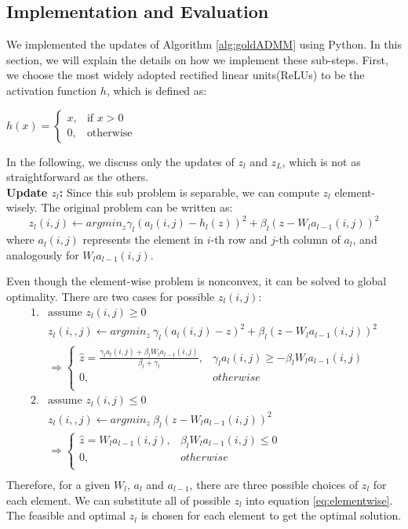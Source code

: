 \documentclass[letterpaper, 10 pt, conference]{ieeeconf}  %
\begin{document}
\subsection{Implementation and Evaluation}
We implemented the updates of  Algorithm \ref{alg:goldADMM} using Python. In this section, we will explain the details on how we implement these sub-steps. First, we choose the most widely adopted rectified linear units(ReLUs) to be the activation function $h$, which is defined as:
\begin{center}
$h(x) = \begin{cases} x, & \mbox{if } x> 0 \\0, & \mbox{otherwise }\end{cases} $
\end{center}

In the following, we discuss only the updates of $z_l$ and $z_L$, which is not as straightforward as the others.\\
\textbf{Update $z_l$:  } Since this sub problem is separable, we can compute $z_l$ element-wisely. The original problem can be written as:
\begin{equation}
z_l(i,j) \gets argmin_z \gamma_l(a_l(i,j)-h_l(z))^2 + \beta_l(z-W_la_{l-1}(i,j))^2
\label{eq:elementwise}
\end{equation}
where $a_l(i,j)$ represents the element in $i$-th row and $j$-th column of $a_l$, and analogously for $W_la_{l-1}(i,j)$.

Even though the element-wise problem is nonconvex, it can be solved to global optimality. There are two cases for possible $z_l(i,j)$:
\begin{equation}
\begin{aligned}
1. & \text{assume } z_l(i,j) \geq 0 \\
& z_l(i,,j) \gets argmin_z ~\gamma_l(a_l(i,j)-z)^2 + \beta_l(z-W_la_{l-1}(i,j))^2\\
& \Rightarrow \left\{
\begin{array}{ll}
      \widehat{z} = \frac{\gamma_la_l(i,j)+\beta_lW_la_{l-1}(i,j)}{\beta_l+\gamma_l}, & \gamma_la_l(i,j)\geq -\beta_lW_la_{l-1}(i,j)\\
      0, & otherwise \\
\end{array} 
\right. \\
2. &  \text{assume } z_l(i,j) \leq 0 \\
& z_l(i,,j) \gets argmin_z ~\beta_l(z-W_la_{l-1}(i,j))^2\\
& \Rightarrow \left\{
\begin{array}{ll}
      \widehat{z} = W_la_{l-1}(i,j), & \beta_lW_la_{l-1}(i,j) \leq 0\\
      0, & otherwise \\
\end{array} 
\right. \\
\end{aligned}
\end{equation}
Therefore, for a given $W_l$, $a_l$ and $a_{l-1}$, there are three possible choices of $z_l$ for each element. We can substitute all of possible $z_l$ into equation \eqref{eq:elementwise}. The feasible and optimal $z_l$ is chosen for each element to get the optimal solution.
\end{document}
